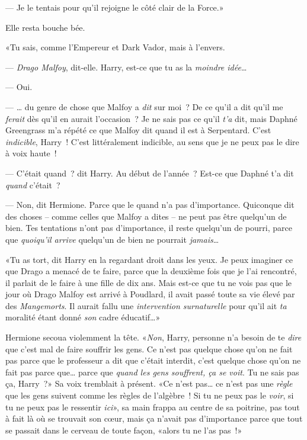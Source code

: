 --- Je le tentais pour qu'il rejoigne le côté clair de la Force.»

Elle resta bouche bée.

«Tu sais, comme l'Empereur et Dark Vador, mais à l'envers.

--- \emph{Drago Malfoy}, dit-elle. Harry, est-ce que tu as la \emph{moindre idée}…

--- Oui.

--- … du genre de chose que Malfoy a \emph{dit} sur moi~? De ce qu'il a dit qu'il me \emph{ferait} dès qu'il en aurait l'occasion~? Je ne sais pas ce qu'il \emph{t'a} dit, mais Daphné Greengrass m'a répété ce que Malfoy dit quand il est à Serpentard. C'est \emph{indicible}, Harry~! C'est littéralement indicible, au sens que je ne peux pas le dire à voix haute~!

--- C'était quand~? dit Harry. Au début de l'année~? Est-ce que Daphné t'a dit \emph{quand} c'était~?

--- Non, dit Hermione. Parce que le quand n'a pas d'importance. Quiconque dit des choses -- comme celles que Malfoy a dites -- ne peut pas être quelqu'un de bien. Tes tentations n'ont pas d'importance, il reste quelqu'un de pourri, parce que \emph{quoiqu'il arrive} quelqu'un de bien ne pourrait \emph{jamais}…

«Tu as tort, dit Harry en la regardant droit dans les yeux. Je peux imaginer ce que Drago a menacé de te faire, parce que la deuxième fois que je l'ai rencontré, il parlait de le faire à une fille de dix ans. Mais est-ce que tu ne vois pas que le jour où Drago Malfoy est arrivé à Poudlard, il avait passé toute sa vie élevé par des \emph{Mangemorts}. Il aurait fallu une \emph{intervention surnaturelle} pour qu'il ait \emph{ta} moralité étant donné \emph{son} cadre éducatif…»

Hermione secoua violemment la tête. «\emph{Non}, Harry, personne n'a besoin de te \emph{dire} que c'est mal de faire souffrir les gens. Ce n'est pas quelque chose qu'on ne fait pas parce que le professeur a dit que c'était interdit, c'est quelque chose qu'on ne fait pas parce que… parce que \emph{quand les gens souffrent, ça se voit}. Tu ne sais pas ça, Harry~?» Sa voix tremblait à présent. «Ce n'est pas… ce n'est pas une \emph{règle} que les gens suivent comme les règles de l'algèbre~! Si tu ne peux pas le \emph{voir}, si tu ne peux pas le ressentir \emph{ici}», sa main frappa au centre de sa poitrine, pas tout à fait là où se trouvait son cœur, mais ça n'avait pas d'importance parce que tout se passait dans le cerveau de toute façon, «alors tu ne l'as pas~!»

